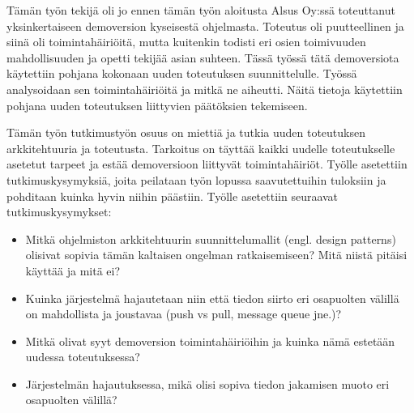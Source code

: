 Tämän työn tekijä oli jo ennen tämän työn aloitusta Alsus Oy:ssä toteuttanut yksinkertaiseen demoversion kyseisestä ohjelmasta. Toteutus oli puutteellinen ja siinä oli toimintahäiriöitä, mutta kuitenkin todisti eri osien toimivuuden mahdollisuuden ja opetti tekijää asian suhteen. Tässä työssä tätä demoversiota käytettiin pohjana kokonaan uuden toteutuksen suunnittelulle. Työssä analysoidaan sen toimintahäiriöitä ja mitkä ne aiheutti. Näitä tietoja käytettiin pohjana uuden toteutuksen liittyvien päätöksien tekemiseen.

Tämän työn tutkimustyön osuus on miettiä ja tutkia uuden toteutuksen arkkitehtuuria ja toteutusta. Tarkoitus on täyttää kaikki uudelle toteutukselle asetetut tarpeet ja estää demoversioon liittyvät toimintahäiriöt. Työlle asetettiin tutkimuskysymyksiä, joita peilataan työn lopussa saavutettuihin tuloksiin ja pohditaan kuinka hyvin niihin päästiin. Työlle asetettiin seuraavat tutkimuskysymykset:
\begin{itemize}
	\item Mitkä ohjelmiston arkkitehtuurin suunnittelumallit (engl. design patterns) olisivat sopivia tämän kaltaisen ongelman ratkaisemiseen? Mitä niistä pitäisi käyttää ja mitä ei?
	\item Kuinka järjestelmä hajautetaan niin että tiedon siirto eri osapuolten välillä on mahdollista ja joustavaa (push vs pull, message queue jne.)?
	\item Mitkä olivat syyt demoversion toimintahäiriöihin ja kuinka nämä estetään uudessa toteutuksessa?
	\item Järjestelmän hajautuksessa, mikä olisi sopiva tiedon jakamisen muoto eri osapuolten välillä?
\end{itemize}
